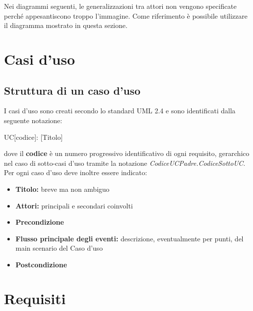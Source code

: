 \documentclass[12pt,a4paper]{article}
\begin{document}
Nei diagrammi seguenti, le generalizzazioni tra attori non vengono specificate perché
appesantiscono troppo l'immagine. Come riferimento è possibile utilizzare il diagramma mostrato in questa
sezione.

\newpage
\section{Casi d'uso}

\subsection{Struttura di un caso d'uso}
I casi d'uso sono creati secondo lo standard UML 2.4 e sono identificati dalla seguente notazione:
\begin{center}
	UC[codice]: [Titolo]
\end{center}
dove il \textbf{codice} è un numero progressivo identificativo di ogni requisito, gerarchico nel  caso di sotto-casi d'uso tramite la notazione \textit{CodiceUCPadre.CodiceSottoUC}. Per ogni caso d'uso deve inoltre essere indicato:
\begin{itemize}
	\item \textbf{Titolo:} breve ma non ambiguo
	\item \textbf{Attori:} principali e secondari coinvolti
	\item \textbf{Precondizione}
	\item \textbf{Flusso principale degli eventi:} descrizione, eventualmente per punti, del main scenario del Caso d'uso
	\item \textbf{Postcondizione}
\end{itemize}



\newpage
\section{Requisiti}
\end{document}
